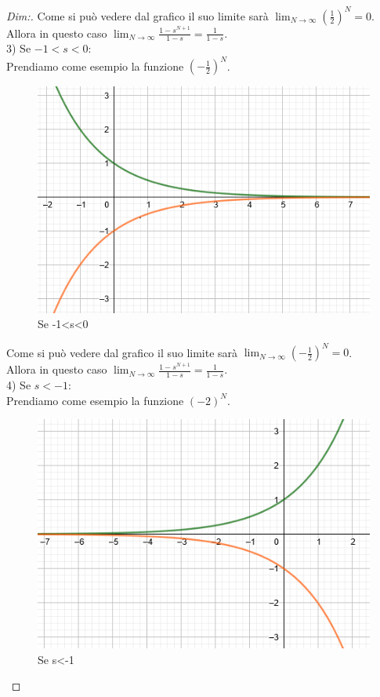 \begin{proof}[Dim:]
	Come si può vedere dal grafico il suo limite sarà $ \lim_{N \to \infty} (\frac{1}{2})^N = 0 $.\\
	Allora in questo caso $ \lim_{N \to \infty} \frac{ 1-s^{N+1} }{ 1-s } = \frac{1}{1-s} $.\\
	
	3) Se $ -1<s<0 $:\\
	Prendiamo come esempio la funzione $ (-\frac{1}{2})^N $.\\
	
	\begin{figure}[h]
		\centering
		\includegraphics[scale=0.5]{immagini/esp3}
		\caption{ Se -1<s<0 }
		\label{fig: esp3}
	\end{figure}
	
	Come si può vedere dal grafico il suo limite sarà $ \lim_{N \to \infty} (-\frac{1}{2})^N = 0 $.\\
	Allora in questo caso $ \lim_{N \to \infty} \frac{ 1-s^{N+1} }{ 1-s } = \frac{1}{1-s} $.\\
	
	4) Se $ s<-1 $:\\
	Prendiamo come esempio la funzione $ (-2)^N $.\\
	
	\begin{figure}[h]
		\centering
		\includegraphics[scale=0.5]{immagini/esp4}
		\caption{ Se s<-1 }
		\label{fig: esp4}
	\end{figure}


\end{proof}
